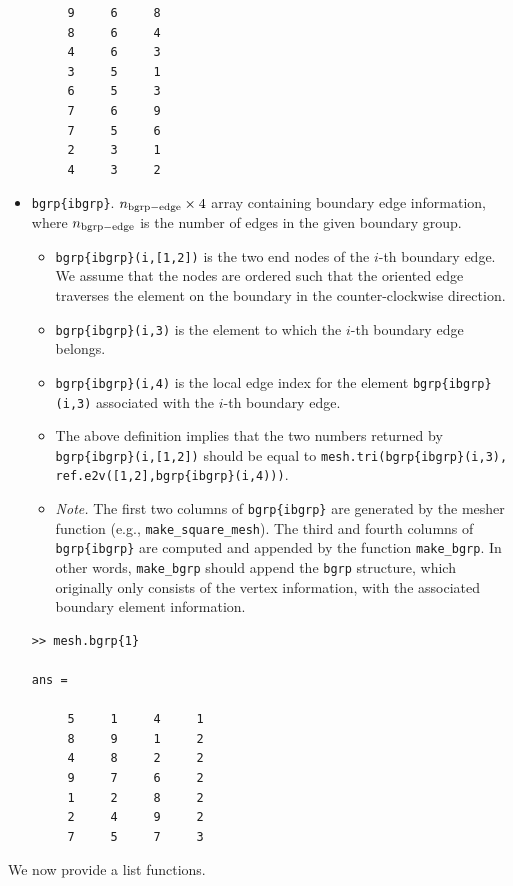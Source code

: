 \documentclass[openany,preprint,11pt]{article}
\begin{document}
\begin{itemize}
\begin{verbatim}
     9     6     8
     8     6     4
     4     6     3
     3     5     1
     6     5     3
     7     6     9
     7     5     6
     2     3     1
     4     3     2
\end{verbatim}
\item \texttt{bgrp\{ibgrp\}}. $n_{\rm bgrp-edge} \times 4$ array containing boundary edge information, where $n_{\rm bgrp-edge}$ is the number of edges in the given boundary group.
  \begin{itemize}
  \item \texttt{bgrp\{ibgrp\}(i,[1,2])} is the two end nodes of the $i$-th boundary edge. We assume that the nodes are ordered such that the oriented edge traverses the element on the boundary in the counter-clockwise direction.
  \item \texttt{bgrp\{ibgrp\}(i,3)} is the element to which the $i$-th boundary edge belongs.
  \item \texttt{bgrp\{ibgrp\}(i,4)} is the local edge index for the element \texttt{bgrp\{ibgrp\}(i,3)} associated with the $i$-th boundary edge.
  \item The above definition implies that the two numbers returned by \texttt{bgrp\{ibgrp\}(i,[1,2])} should be equal to \texttt{mesh.tri(bgrp\{ibgrp\}(i,3), ref.e2v([1,2],bgrp\{ibgrp\}(i,4)))}.
  \item \emph{Note.} The first two columns of \texttt{bgrp\{ibgrp\}} are generated by the mesher function (e.g., \texttt{make\_square\_mesh}).  The third and fourth columns of \texttt{bgrp\{ibgrp\}} are computed and appended by the function \texttt{make\_bgrp}. In other words, \texttt{make\_bgrp} should append the \texttt{bgrp} structure, which originally only consists of the vertex information, with the associated boundary element information.
  \end{itemize}
\begin{verbatim}
>> mesh.bgrp{1}

ans =

     5     1     4     1
     8     9     1     2
     4     8     2     2
     9     7     6     2
     1     2     8     2
     2     4     9     2
     7     5     7     3
\end{verbatim}
\end{itemize}
We now provide a list functions.
\end{document}
